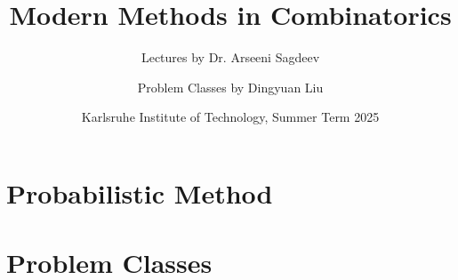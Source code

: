 \documentclass[11pt,a4paper]{article}
\title{Modern Methods in Combinatorics}
\author{Lectures by Dr. Arseeni Sagdeev \and Problem Classes by Dingyuan Liu \and \TODO{\textcolor{red}{cite books}}}
\date{Karlsruhe Institute of Technology, Summer Term 2025}
\theoremstyle{definition}
\theoremstyle{remark}
\begin{document}
\maketitle
\vspace{2cm}


\newpage
\tableofcontents

\newpage

\section{Probabilistic Method}


\newpage
\section{Problem Classes}


\printindex
\end{document}
